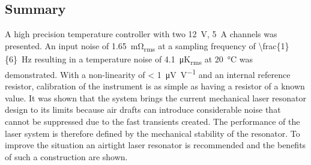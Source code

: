 \subsection{Summary}
A high precision temperature controller with two \qty{12}{V}, \qty{5}{\A} channels was presented. An input noise of \qty{1.65}{\milli\ohm_{rms}} at a sampling frequency of \qty[parse-numbers = false]{\frac{1}{6}}{\Hz} resulting in a temperature noise of \qty{4.1}{\micro \K_{rms}} at \qty{20}{\celsius} was demonstrated. With a non-linearity of \qty{< 1}{\uV \per V} and an internal reference resistor, calibration of the instrument is as simple as having a resistor of a known value. It was shown that the system brings the current mechanical laser resonator design to its limits because air drafts can introduce considerable noise that cannot be suppressed due to the fast transients created. The performance of the laser system is therefore defined by the mechanical stability of the resonator. To improve the situation an airtight laser resonator is recommended and the benefits of such a construction are shown.

